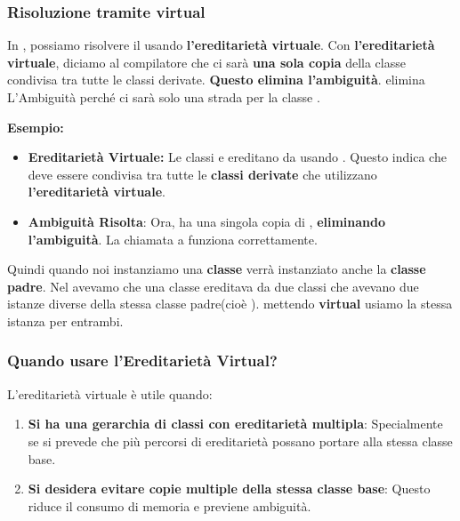 \subsubsection{Risoluzione tramite virtual}
In , possiamo risolvere il \textcolor{blue}{} usando \textbf{l'ereditarietà virtuale}. Con \textbf{l'ereditarietà virtuale}, diciamo al compilatore che ci sarà \textbf{una sola copia} della classe  condivisa tra tutte le classi derivate. \textbf{Questo elimina l'ambiguità}. elimina L'Ambiguità perché ci sarà solo una strada per la classe .
\begin{tcolorbox}[width=14cm, boxsep=10pt]
    \textbf{Esempio:}
    
    \begin{itemize}
        \item \textbf{Ereditarietà Virtuale:} Le classi  e  ereditano da  usando \textcolor{blue}{}. Questo indica che  deve essere condivisa tra tutte le \textbf{classi derivate} che utilizzano \textbf{l'ereditarietà virtuale}.
        \item \textbf{Ambiguità Risolta}: Ora,  ha una singola copia di ,\textbf{ eliminando l'ambiguità}. La chiamata a  funziona correttamente.
    \end{itemize}
\end{tcolorbox}\newpage
Quindi quando noi instanziamo una \textbf{classe} verrà instanziato anche la \textbf{classe} \textbf{padre}. Nel \textcolor{blue}{} avevamo che una classe ereditava da due classi che avevano due istanze diverse della stessa classe padre(cioè ). mettendo \textbf{virtual} usiamo la stessa istanza per entrambi.
\subsubsection{Quando usare l'Ereditarietà Virtual?}
L'ereditarietà virtuale è utile quando:
\begin{enumerate}
    \item \textbf{Si ha una gerarchia di classi con ereditarietà multipla}: Specialmente se si prevede che più percorsi di ereditarietà possano portare alla stessa classe base.
    \item  \textbf{Si desidera evitare copie multiple della stessa classe base}: Questo riduce il consumo di memoria e previene ambiguità.
\end{enumerate}
\newpage
